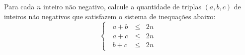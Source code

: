 Para cada $n$ inteiro não negativo, calcule a quantidade de triplas $(a, b, c)$ de inteiros não negativos que satisfazem o sistema de inequações abaixo:
\[
\begin{cases}
	\ 
	\begin{aligned}	
	a + b \ & \le&2n\\
	a + c \ & \le&2n\\
	b + c \ & \le&2n
	\end{aligned}
\end{cases}
\]
